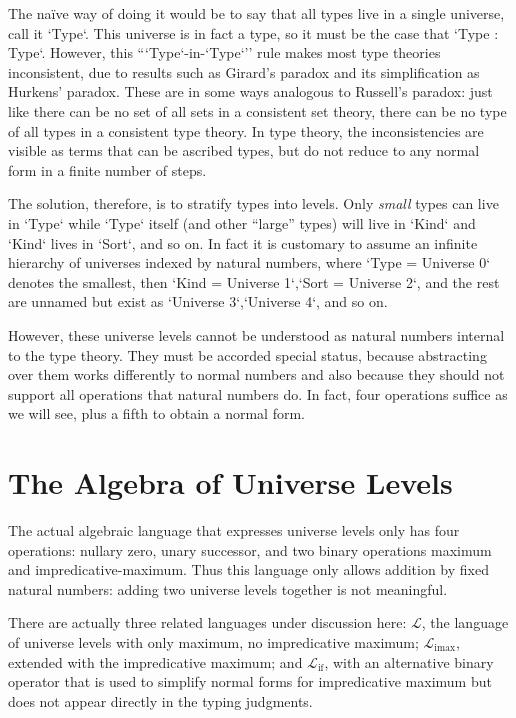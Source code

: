\documentclass[11pt, twoside, reqno]{book}
\DeclareMathOperator{\imax}{imax}
\DeclareMathOperator{\ifop}{if}
\begin{document}
The na\" ive way of doing it would be to say that all types live in a single universe, call it \inHS`Type`.
This universe is in fact a type, so it must be the case that \inHS`Type : Type`.
However, this ``\inHS`Type`-in-\inHS`Type`'' rule makes most type theories inconsistent, due to results such as Girard's paradox and its simplification as Hurkens' paradox.
These are in some ways analogous to Russell's paradox: just like there can be no set of all sets in a consistent set theory, there can be no type of all types in a consistent type theory.
In type theory, the inconsistencies are visible as terms that can be ascribed types, but do not reduce to any normal form in a finite number of steps.

The solution, therefore, is to stratify types into levels.
Only \emph{small} types can live in \inHS`Type` while \inHS`Type` itself (and other ``large'' types) will live in \inHS`Kind` and \inHS`Kind` lives in \inHS`Sort`, and so on.
In fact it is customary to assume an infinite hierarchy of universes indexed by natural numbers, where \inHS`Type = Universe 0` denotes the smallest, then \inHS`Kind = Universe 1`,\enskip\inHS`Sort = Universe 2`, and the rest are unnamed but exist as \inHS`Universe 3`,\enskip\inHS`Universe 4`, and so on.

However, these universe levels cannot be understood as natural numbers internal to the type theory.
They must be accorded special status, because abstracting over them works differently to normal numbers and also because they should not support all operations that natural numbers do.
In fact, four operations suffice as we will see, plus a fifth to obtain a normal form.

\section{The Algebra of Universe Levels}
\label{alg-uni-lvl}

The actual algebraic language that expresses universe levels only has four operations: nullary zero, unary successor, and two binary operations maximum and impredicative-maximum.
Thus this language only allows addition by fixed natural numbers: adding two universe levels together is not meaningful.

There are actually three related languages under discussion here: \(\mathcal{L}\), the language of universe levels with only maximum, no impredicative maximum; \(\mathcal{L}_{\imax}\), extended with the impredicative maximum; and \(\mathcal{L}_{\ifop}\), with an alternative binary operator that is used to simplify normal forms for impredicative maximum but does not appear directly in the typing judgments.
\end{document}
